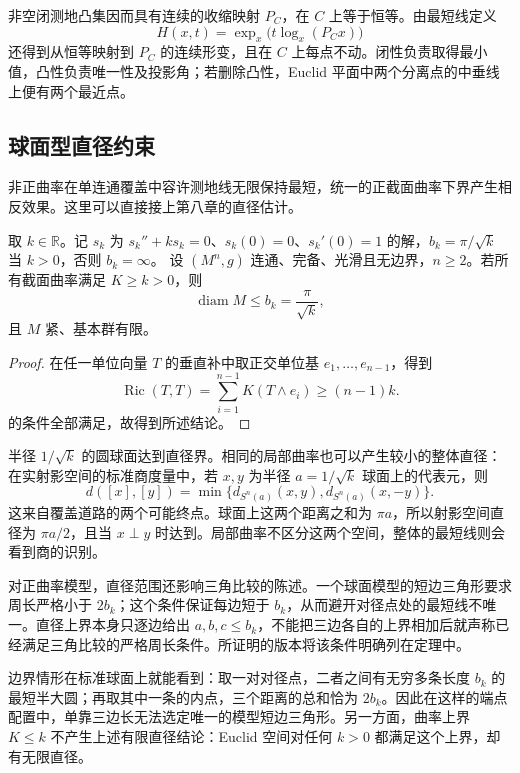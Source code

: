 非空闭测地凸集因而具有连续的收缩映射 \(P_C\)，在 \(C\) 上等于恒等。由最短线定义
\[
	H(x,t)=\exp_x\bigl(t\log_x(P_Cx)\bigr)
\]
还得到从恒等映射到 \(P_C\) 的连续形变，且在 \(C\) 上每点不动。闭性负责取得最小值，凸性负责唯一性及投影角；若删除凸性，Euclid 平面中两个分离点的中垂线上便有两个最近点。

\subsection{球面型直径约束}
\label{g3:subsec:0904:02}

非正曲率在单连通覆盖中容许测地线无限保持最短，统一的正截面曲率下界产生相反效果。这里可以直接接上第八章的直径估计。

\begin{corollary}\label{g3:cor:positive-sectional-diameter}
	取 \(k\in\mathbb R\)。记 \(s_k\) 为 \(s_k''+ks_k=0\)、\(s_k(0)=0\)、\(s_k'(0)=1\) 的解，\(b_k=\pi/\sqrt k\) 当 \(k>0\)，否则 \(b_k=\infty\)。
	设 \((M^n,g)\) 连通、完备、光滑且无边界，\(n\ge2\)。若所有截面曲率满足 \(K\ge k>0\)，则
	\[
		\operatorname{diam}M\le b_k=\frac{\pi}{\sqrt k},
	\]
	且 \(M\) 紧、基本群有限。
\end{corollary}
\begin{proof}
	在任一单位向量 \(T\) 的垂直补中取正交单位基 \(e_1,\ldots,e_{n-1}\)，得到
	\[
		\operatorname{Ric}(T,T)=\sum_{i=1}^{n-1}K(T\wedge e_i)\ge(n-1)k.
	\]
	的条件全部满足，故得到所述结论。
\end{proof}

半径 \(1/\sqrt k\) 的圆球面达到直径界。相同的局部曲率也可以产生较小的整体直径：在实射影空间的标准商度量中，若 \(x,y\) 为半径 \(a=1/\sqrt k\) 球面上的代表元，则
\[
	d([x],[y])=\min\{d_{S^n(a)}(x,y),d_{S^n(a)}(x,-y)\}.
\]
这来自覆盖道路的两个可能终点。球面上这两个距离之和为 \(\pi a\)，所以射影空间直径为 \(\pi a/2\)，且当 \(x\perp y\) 时达到。局部曲率不区分这两个空间，整体的最短线则会看到商的识别。

\ProseParagraphBreak

对正曲率模型，直径范围还影响三角比较的陈述。一个球面模型的短边三角形要求周长严格小于 \(2b_k\)；这个条件保证每边短于 \(b_k\)，从而避开对径点处的最短线不唯一。直径上界本身只逐边给出 \(a,b,c\le b_k\)，不能把三边各自的上界相加后就声称已经满足三角比较的严格周长条件。所证明的版本将该条件明确列在定理中。

边界情形在标准球面上就能看到：取一对对径点，二者之间有无穷多条长度 \(b_k\) 的最短半大圆；再取其中一条的内点，三个距离的总和恰为 \(2b_k\)。因此在这样的端点配置中，单靠三边长无法选定唯一的模型短边三角形。另一方面，曲率上界 \(K\le k\) 不产生上述有限直径结论：Euclid 空间对任何 \(k>0\) 都满足这个上界，却有无限直径。

